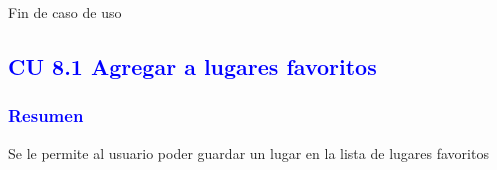 Fin de caso de uso
\newpage



\pagebreak
\subsection{\textcolor{blue}{CU 8.1 Agregar a lugares favoritos}}
\subsubsection{\textcolor{blue}{Resumen}}
 Se le permite al usuario poder guardar un lugar en la lista de lugares favoritos
